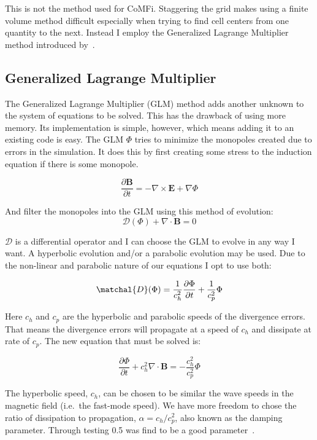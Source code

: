 \documentclass[12pt,upcase]{umlthesis}
\begin{document}
This is not the method used for CoMFi. Staggering the grid makes using a finite volume method difficult especially when trying to find cell centers from one quantity to the next. Instead I employ the Generalized Lagrange Multiplier method introduced by~\citet{glm}. 

\subsection{Generalized Lagrange Multiplier}

The Generalized Lagrange Multiplier (GLM) method adds another unknown to the system of equations to be solved. This has the drawback of using more memory. Its implementation is simple, however, which means adding it to an existing code is easy. The GLM $\Phi$ tries to minimize the monopoles created due to errors in the simulation. It does this by first creating some stress to the induction equation if there is some monopole.

\begin{equation}
	\frac{\partial\textbf{B}}{\partial t} = - \nabla\times\textbf{E} + \nabla \Phi
\end{equation}

And filter the monopoles into the GLM using this method of evolution:
\begin{equation}
	\mathcal{D}(\Phi) + \nabla\cdot\textbf{B} = 0
\end{equation}

$\mathcal{D}$ is a differential operator and I can choose the GLM to evolve in any way I want. A hyperbolic evolution and/or a parabolic evolution may be used. Due to the non-linear and parabolic nature of our equations I opt to use both:

\begin{equation}
	\matchal{D}(\Phi) = \frac{1}{c^2_h}\frac{\partial\Phi}{\partial t} + \frac{1}{c^2_p}\Phi
\end{equation}

Here $c_h$ and $c_p$ are the hyperbolic and parabolic speeds of the divergence errors. That means the divergence errors will propagate at a speed of $c_h$ and dissipate at rate of $c_p$. The new equation that must be solved is:

\begin{equation}\label{eq:glm}
	\frac{\partial\Phi}{\partial t} + c^2_h \nabla\cdot\textbf{B} = - \frac{c^2_h}{c^2_p} \Phi
\end{equation}

The hyperbolic speed, $c_h$, can be chosen to be similar the wave speeds in the magnetic field (i.e.\ the fast-mode speed). We have more freedom to chose the ratio of dissipation to propagation, $\alpha = c_h / c^2_p$, also known as the damping parameter. Through testing 0.5 was find to be a good parameter~\citep[p. 5899-5911]{glm2}.
\end{document}
